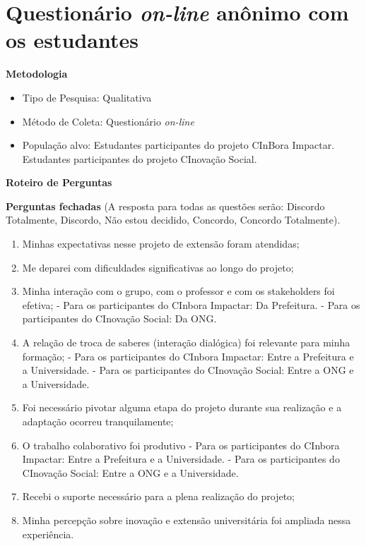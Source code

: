 \chapter{Questionário \textit{on-line} anônimo com os estudantes}
\par\vspace{1\baselineskip}
\textbf{Metodologia}
\begin{itemize}
    \item Tipo de Pesquisa: Qualitativa
    \item Método de Coleta: Questionário \textit{on-line}
    \item População alvo: Estudantes participantes do projeto CInBora Impactar. Estudantes participantes do projeto CInovação Social.
\end{itemize}
\par\vspace{1\baselineskip}
\textbf{Roteiro de Perguntas}
\par\vspace{1\baselineskip}
\textbf{Perguntas fechadas} (A resposta para todas as questões serão: Discordo Totalmente, Discordo, Não estou decidido, Concordo, Concordo Totalmente).
\begin{enumerate}
    \item Minhas expectativas nesse projeto de extensão foram atendidas;
    \item Me deparei com dificuldades significativas ao longo do projeto;
    \item Minha interação com o grupo, com o professor e com os stakeholders foi efetiva; 
      - Para os participantes do CInbora Impactar: Da Prefeitura.
    - Para os participantes do CInovação Social: Da \gls{ONG}.
    \item A relação de troca de saberes (interação dialógica) foi relevante para minha formação;
     - Para os participantes do CInbora Impactar: Entre a Prefeitura e a Universidade.
    - Para os participantes do CInovação Social: Entre a \gls{ONG} e a Universidade.
    \item Foi necessário pivotar alguma etapa do projeto durante sua realização e a adaptação ocorreu tranquilamente;
    \item O trabalho colaborativo foi produtivo
     - Para os participantes do CInbora Impactar: Entre a Prefeitura e a Universidade.
    - Para os participantes do CInovação Social: Entre a \gls{ONG} e a Universidade.
    \item Recebi o suporte necessário para a plena realização do projeto;
    \item Minha percepção sobre inovação e extensão universitária foi ampliada nessa experiência.
\end{enumerate}
